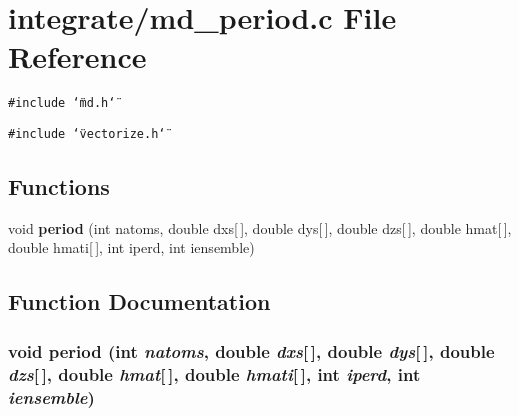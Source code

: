 \section{integrate/md\_\-period.c File Reference}
\label{md__period_8c}
{\tt \#include \char`\"{}md.h\char`\"{}}\par
{\tt \#include \char`\"{}vectorize.h\char`\"{}}\par
\subsection*{Functions}
\begin{CompactItemize}
\item 
void {\bf period} (int natoms, double dxs[$\,$], double dys[$\,$], double dzs[$\,$], double hmat[$\,$], double hmati[$\,$], int iperd, int iensemble)
\end{CompactItemize}


\subsection{Function Documentation}
\subsubsection{\setlength{\rightskip}{0pt plus 5cm}void period (int {\em natoms}, double {\em dxs}[$\,$], double {\em dys}[$\,$], double {\em dzs}[$\,$], double {\em hmat}[$\,$], double {\em hmati}[$\,$], int {\em iperd}, int {\em iensemble})}\label{md__period_8c_17adce6e743f0dfd43a8d1e6c5435de8}


